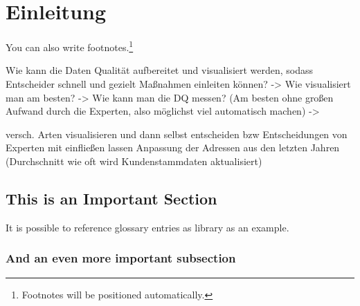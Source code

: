\chapter{Einleitung}\label{ch:intro}

You can also write footnotes.\footnote{Footnotes will be positioned automatically.}

Wie kann die Daten Qualität aufbereitet und visualisiert werden, sodass Entscheider schnell und gezielt Maßnahmen einleiten können?
-> Wie visualisiert man am besten?
-> Wie kann man die DQ messen? (Am besten ohne großen Aufwand durch die Experten, also möglichst viel automatisch machen)
-> 

versch. Arten visualisieren und dann selbst entscheiden bzw Entscheidungen von Experten mit einfließen lassen
Anpassung der Adressen aus den letzten Jahren (Durchschnitt wie oft wird Kundenstammdaten aktualisiert)

\section{This is an Important Section}

It is possible to reference glossary entries as \gls{library} as an example.


\subsection{And an even more important subsection}

